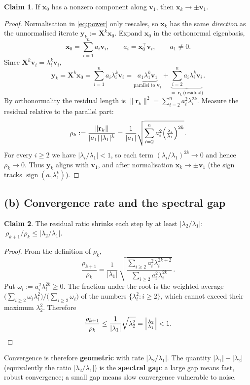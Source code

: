 \documentclass[12pt,a4paper]{article}
\theoremstyle{definition}
\newtheorem*{claim}{Claim}
\newcommand{\Xb}{\mathbf{X}}
\newcommand{\vv}{\mathbf{v}}
\newcommand{\xx}{\mathbf{x}}
\newcommand{\yy}{\mathbf{y}}
\newcommand{\rr}{\mathbf{r}}
\newcommand{\norm}[1]{\lVert #1 \rVert}
\newcommand{\T}{^{\!\top}}
\begin{document}
\begin{claim}
If $\xx_0$ has a nonzero component along $\vv_1$, then $\xx_k\to\pm\vv_1$.
\end{claim}
\begin{proof}
Normalisation in \eqref{eq:power} only rescales, so $\xx_k$ has the same
\emph{direction} as the unnormalised iterate
$\yy_k:=\Xb^{k}\xx_0$. Expand $\xx_0$ in the orthonormal eigenbasis,
\[
\xx_0=\sum_{i=1}^{n} a_i\vv_i,\qquad a_i=\xx_0\T\vv_i,\qquad a_1\ne0 .
\]
Since $\Xb^{k}\vv_i=\lambda_i^{k}\vv_i$,
\[
\yy_k=\Xb^{k}\xx_0=\sum_{i=1}^{n} a_i\lambda_i^{k}\vv_i
      =\underbrace{a_1\lambda_1^{k}\vv_1}_{\text{parallel to }\vv_1}
      +\underbrace{\sum_{i=2}^{n} a_i\lambda_i^{k}\vv_i}_{=\ \rr_k\ \text{(residual)}} .
\]
By orthonormality the residual length is
$\norm{\rr_k}^2=\sum_{i=2}^{n} a_i^2\lambda_i^{2k}$. Measure the residual
relative to the parallel part:
\[
\rho_k:=\frac{\norm{\rr_k}}{|a_1|\,|\lambda_1|^{k}}
       =\frac{1}{|a_1|}\sqrt{\sum_{i=2}^{n} a_i^2\Bigl(\tfrac{\lambda_i}{\lambda_1}\Bigr)^{2k}} .
\]
For every $i\ge2$ we have $|\lambda_i/\lambda_1|<1$, so each term
$(\lambda_i/\lambda_1)^{2k}\to0$ and hence $\rho_k\to0$. Thus $\yy_k$ aligns
with $\vv_1$, and after normalisation $\xx_k\to\pm\vv_1$ (the sign tracks
$\operatorname{sign}(a_1\lambda_1^{k})$). \end{proof}

\subsection{(b) Convergence rate and the spectral gap}

\begin{claim}
The residual ratio shrinks each step by at least $|\lambda_2/\lambda_1|$:
$\ \rho_{k+1}/\rho_k\le |\lambda_2/\lambda_1|$.
\end{claim}
\begin{proof}
From the definition of $\rho_k$,
\[
\frac{\rho_{k+1}}{\rho_k}
=\frac{1}{|\lambda_1|}\,
\sqrt{\frac{\sum_{i\ge2} a_i^2\lambda_i^{2k+2}}{\sum_{i\ge2} a_i^2\lambda_i^{2k}}}\, .
\]
Put $\omega_i:=a_i^2\lambda_i^{2k}\ge0$. The fraction under the root is the
weighted average $\bigl(\sum_{i\ge2}\omega_i\lambda_i^{2}\bigr)\big/\bigl(\sum_{i\ge2}\omega_i\bigr)$
of the numbers $\{\lambda_i^2:i\ge2\}$, which cannot exceed their maximum
$\lambda_2^{2}$. Therefore
\[
\frac{\rho_{k+1}}{\rho_k}\le\frac{1}{|\lambda_1|}\sqrt{\lambda_2^{2}}
=\Bigl|\tfrac{\lambda_2}{\lambda_1}\Bigr|<1 .
\]
\end{proof}
Convergence is therefore \textbf{geometric} with rate $|\lambda_2/\lambda_1|$.
The quantity $|\lambda_1|-|\lambda_2|$ (equivalently the ratio
$|\lambda_2/\lambda_1|$) is the \textbf{spectral gap}: a large gap means fast,
robust convergence; a small gap means slow convergence vulnerable to noise.
\end{document}
